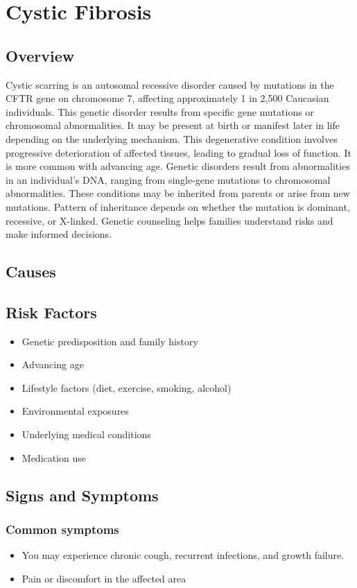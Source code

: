 \chapter{Cystic Fibrosis}
\label{sec:Cystic Fibrosis}

\section{Overview}
Cystic scarring is an autosomal recessive disorder caused by mutations in the CFTR gene on chromosome 7, affecting approximately 1 in 2,500 Caucasian individuals. This genetic disorder results from specific gene mutations or chromosomal abnormalities. It may be present at birth or manifest later in life depending on the underlying mechanism. This degenerative condition involves progressive deterioration of affected tissues, leading to gradual loss of function. It is more common with advancing age. Genetic disorders result from abnormalities in an individual's DNA, ranging from single-gene mutations to chromosomal abnormalities. These conditions may be inherited from parents or arise from new mutations. Pattern of inheritance depends on whether the mutation is dominant, recessive, or X-linked. Genetic counseling helps families understand risks and make informed decisions.
\section{Causes}
\section{Risk Factors}

\begin{itemize}[noitemsep]
  \item Genetic predisposition and family history
  \item Advancing age
  \item Lifestyle factors (diet, exercise, smoking, alcohol)
  \item Environmental exposures
  \item Underlying medical conditions
  \item Medication use
\end{itemize}
\section{Signs and Symptoms}

\subsection{Common symptoms}
\begin{itemize}[noitemsep]
  \item You may experience chronic cough, recurrent infections, and growth failure.

  \item Pain or discomfort in the affected area
  \end{itemize}

